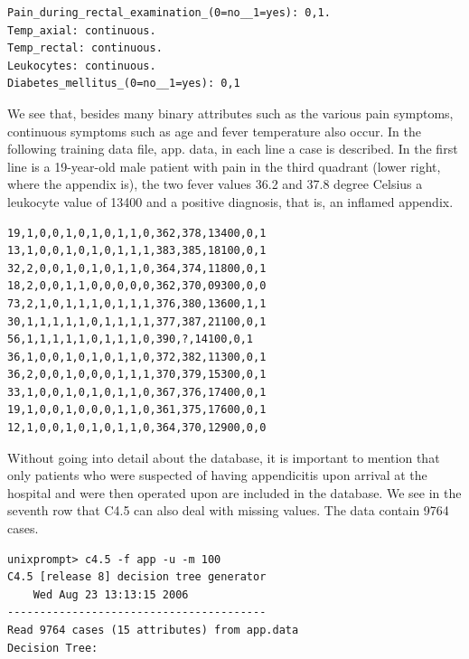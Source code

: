 \documentclass[10pt]{book}
\begin{document}
\begin{verbatim}
Pain_during_rectal_examination_(0=no__1=yes): 0,1.
Temp_axial: continuous.
Temp_rectal: continuous.
Leukocytes: continuous.
Diabetes_mellitus_(0=no__1=yes): 0,1
\end{verbatim}

We see that, besides many binary attributes such as the various pain symptoms, continuous symptoms such as age and fever temperature also occur. In the following training data file, app. data, in each line a case is described. In the first line is a 19-year-old male patient with pain in the third quadrant (lower right, where the appendix is), the two fever values 36.2 and 37.8 degree Celsius a leukocyte value of 13400 and a positive diagnosis, that is, an inflamed appendix.

\begin{verbatim}
19,1,0,0,1,0,1,0,1,1,0,362,378,13400,0,1
13,1,0,0,1,0,1,0,1,1,1,383,385,18100,0,1
32,2,0,0,1,0,1,0,1,1,0,364,374,11800,0,1
18,2,0,0,1,1,0,0,0,0,0,362,370,09300,0,0
73,2,1,0,1,1,1,0,1,1,1,376,380,13600,1,1
30,1,1,1,1,1,0,1,1,1,1,377,387,21100,0,1
56,1,1,1,1,1,0,1,1,1,0,390,?,14100,0,1
36,1,0,0,1,0,1,0,1,1,0,372,382,11300,0,1
36,2,0,0,1,0,0,0,1,1,1,370,379,15300,0,1
33,1,0,0,1,0,1,0,1,1,0,367,376,17400,0,1
19,1,0,0,1,0,0,0,1,1,0,361,375,17600,0,1
12,1,0,0,1,0,1,0,1,1,0,364,370,12900,0,0
\end{verbatim}

Without going into detail about the database, it is important to mention that only patients who were suspected of having appendicitis upon arrival at the hospital and were then operated upon are included in the database. We see in the seventh row that C4.5 can also deal with missing values. The data contain 9764 cases.

\begin{verbatim}
unixprompt> c4.5 -f app -u -m 100
C4.5 [release 8] decision tree generator
    Wed Aug 23 13:13:15 2006
----------------------------------------
Read 9764 cases (15 attributes) from app.data
Decision Tree:
\end{verbatim}
\end{document}
